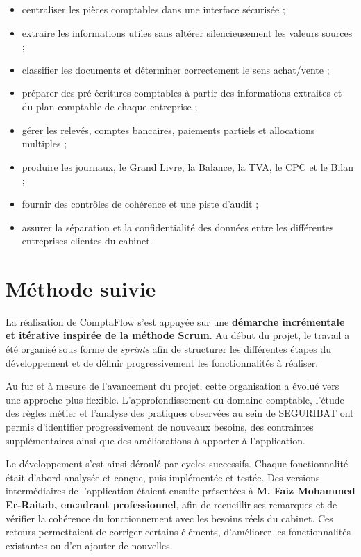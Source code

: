 \documentclass[12pt,a4paper,oneside]{report}
\begin{document}
\begin{itemize}[leftmargin=*]
  \item centraliser les pièces comptables dans une interface sécurisée ;
  \item extraire les informations utiles sans altérer silencieusement les valeurs sources ;
  \item classifier les documents et déterminer correctement le sens achat/vente ;
  \item préparer des pré-écritures comptables à partir des informations extraites et du plan comptable de chaque entreprise ;
  \item gérer les relevés, comptes bancaires, paiements partiels et allocations multiples ;
  \item produire les journaux, le Grand Livre, la Balance, la TVA, le CPC et le Bilan ;
  \item fournir des contrôles de cohérence et une piste d'audit ;
  \item assurer la séparation et la confidentialité des données entre les différentes entreprises clientes du cabinet.
\end{itemize}

\section{Méthode suivie}

La réalisation de ComptaFlow s'est appuyée sur une \textbf{démarche incrémentale et itérative inspirée de la méthode Scrum}. Au début du projet, le travail a été organisé sous forme de \textit{sprints} afin de structurer les différentes étapes du développement et de définir progressivement les fonctionnalités à réaliser.

Au fur et à mesure de l'avancement du projet, cette organisation a évolué vers une approche plus flexible. L'approfondissement du domaine comptable, l'étude des règles métier et l'analyse des pratiques observées au sein de SEGURIBAT ont permis d'identifier progressivement de nouveaux besoins, des contraintes supplémentaires ainsi que des améliorations à apporter à l'application.

Le développement s'est ainsi déroulé par cycles successifs. Chaque fonctionnalité était d'abord analysée et conçue, puis implémentée et testée. Des versions intermédiaires de l'application étaient ensuite présentées à \textbf{M. Faiz Mohammed Er-Raitab, encadrant professionnel}, afin de recueillir ses remarques et de vérifier la cohérence du fonctionnement avec les besoins réels du cabinet. Ces retours permettaient de corriger certains éléments, d'améliorer les fonctionnalités existantes ou d'en ajouter de nouvelles.
\end{document}

